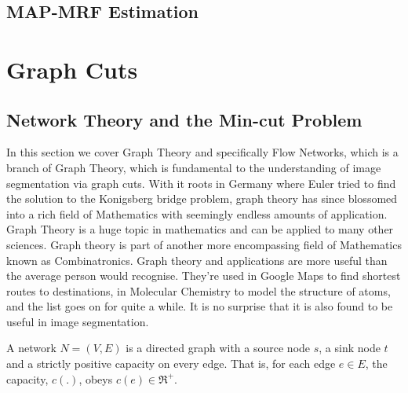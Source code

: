 
\subsection{MAP-MRF Estimation}
\label{sec:MAPMRFEstimation}


\section{Graph Cuts}
\label{sec:GraphCuts}


\subsection{Network Theory and the Min-cut Problem}
\label{sec:NetworkTheory}

In this section we cover Graph Theory and specifically Flow Networks, which is a branch of Graph Theory, which is fundamental to the understanding of image segmentation via graph cuts. With it roots in Germany where Euler tried to find the solution to the Konigsberg bridge problem, graph theory has since blossomed into a rich field of Mathematics with seemingly endless amounts of application. Graph Theory is a huge topic in mathematics and can be applied to many other sciences. Graph theory is part of another more encompassing field of Mathematics known as Combinatronics. Graph theory and applications are more useful than the average person would recognise. They're used in Google Maps to find shortest routes to destinations, in Molecular Chemistry to model the structure of atoms, and the list goes on for quite a while. It is no surprise that it is also found to be useful in image segmentation.

\begin{definition}[Network]
	A network $N = (V,E)$ is a directed graph with a source node $s$, a sink node $t$ and a strictly positive capacity on every edge. That is, for each edge $e \in E$, the capacity, $c(.)$, obeys $c(e) \in \Re^{+}$.
\end{definition}

